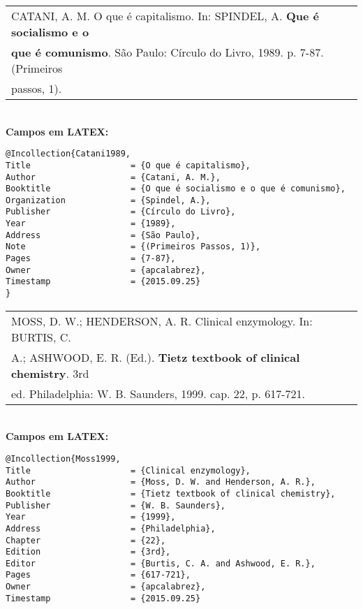 \begin{tabular}{|l|c|} \hline
CATANI, A. M. O que é capitalismo. In: SPINDEL, A. \textbf{Que é socialismo e o}\\ \textbf{que é comunismo}. São Paulo: Círculo do Livro, 1989. p. 7-87. (Primeiros \\passos, 1).    \\\hline
\end{tabular} \\

	\textbf{Campos em LATEX:} 
	
	\begin{verbatim}
@Incollection{Catani1989,
Title                    = {O que é capitalismo},
Author                   = {Catani, A. M.},
Booktitle                = {O que é socialismo e o que é comunismo},
Organization             = {Spindel, A.},
Publisher                = {Círculo do Livro},
Year                     = {1989},
Address                  = {São Paulo},
Note                     = {(Primeiros Passos, 1)},
Pages                    = {7-87},
Owner                    = {apcalabrez},
Timestamp                = {2015.09.25}
}
\end{verbatim}


\begin{tabular}{|l|c|} \hline
MOSS, D. W.; HENDERSON, A. R. Clinical enzymology. In: BURTIS, C. \\A.; ASHWOOD, E. R. (Ed.). \textbf{Tietz textbook of clinical chemistry}. 3rd\\ ed. Philadelphia: W. B. Saunders, 1999. cap. 22, p. 617-721.  \\\hline
\end{tabular} \\

\textbf{Campos em LATEX:} 

\begin{verbatim}
@Incollection{Moss1999,
Title                    = {Clinical enzymology},
Author                   = {Moss, D. W. and Henderson, A. R.},
Booktitle                = {Tietz textbook of clinical chemistry},
Publisher                = {W. B. Saunders},
Year                     = {1999},
Address                  = {Philadelphia},
Chapter                  = {22},
Edition                  = {3rd},
Editor                   = {Burtis, C. A. and Ashwood, E. R.},
Pages                    = {617-721},
Owner                    = {apcalabrez},
Timestamp                = {2015.09.25}
\end{verbatim}

